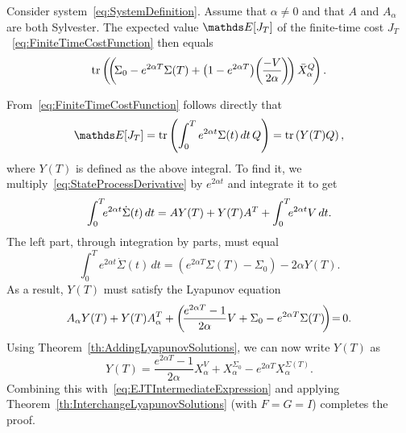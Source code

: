 \documentclass[twocolumn]{autart}
\begin{document}
\begin{thm}\label{th:FiniteTimeCostMean}
Consider system~\eqref{eq:SystemDefinition}. Assume that $\alpha \neq 0$ and that $A$ and $A_\alpha$ are both Sylvester. The expected value $\ex[J_T]$ of the finite-time cost $J_T$~\eqref{eq:FiniteTimeCostFunction} then equals
\begin{equation}
\mbox{tr}\left(\hspace{-2pt}\left(\hspace{-2pt}\Sigma_0 - e^{2\alpha T} \Sigma(T) + \left(1 - e^{2\alpha T}\right)\hspace{-2pt}\left(\hspace{-1pt}\frac{-V}{2\alpha}\hspace{-1pt}\right)\hspace{-2pt}\right) \bar{X}_\alpha^Q\hspace{-2pt}\right). \label{eq:FiniteTimeCostMean}
\end{equation}
\end{thm}
\begin{pf}
From~\eqref{eq:FiniteTimeCostFunction} follows directly that
\begin{equation}
\ex[J_T] = \tr\left(\int_0^T e^{2\alpha t} \Sigma(t) \, dt \, Q\right) = \tr\left(Y(T)Q\right), \label{eq:EJTIntermediateExpression}
\end{equation}
where $Y(T)$ is defined as the above integral. To find it, we multiply~\eqref{eq:StateProcessDerivative} by $e^{2\alpha t}$ and integrate it to get
\begin{equation}
\int_0^T \hspace{-4pt} e^{2\alpha t} \dot{\Sigma}(t) \, dt = A Y(T) + Y(T) A^T + \int_0^T \hspace{-4pt} e^{2\alpha t} V \, dt.
\end{equation}
The left part, through integration by parts, must equal
\begin{equation}
\int_0^T e^{2\alpha t} \dot{\Sigma}(t) \, dt = \left(e^{2\alpha T} \Sigma(T) - \Sigma_0\right) - 2\alpha Y(T).
\end{equation}
As a result, $Y(T)$ must satisfy the Lyapunov equation
\begin{equation}
A_\alpha Y(T) + Y(T) A_\alpha^T + \left(\hspace{-2pt}\frac{e^{2\alpha T} - 1}{2\alpha} V + \Sigma_0 - e^{2\alpha T} \Sigma(T)\hspace{-2pt}\right) \hspace{-2pt}=\hspace{-1pt} 0.
\end{equation}
Using Theorem~\ref{th:AddingLyapunovSolutions}, we can now write $Y(T)$ as
\begin{equation}
Y(T) = \frac{e^{2\alpha T} - 1}{2\alpha}X_\alpha^V + X_\alpha^{\Sigma_0} - e^{2\alpha T} X_\alpha^{\Sigma(T)}.
\end{equation}
Combining this with~\eqref{eq:EJTIntermediateExpression} and applying Theorem~\ref{th:InterchangeLyapunovSolutions} (with $F = G = I$) completes the proof.
\end{pf}
\end{document}

